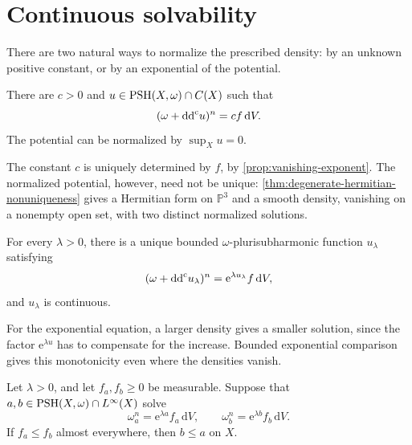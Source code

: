 \section{Continuous solvability}

There are two natural ways to normalize the prescribed density: by an unknown positive constant, or by an exponential of the potential.

\begin{theorem}\label{thm:kn-continuous}
There are $c>0$ and $u\in\mathrm{PSH}(X,\omega)\cap C(X)$ such that
\[
 (\omega+\mathrm{dd}^{\mathrm{c}} u)^n=c f\,\mathrm{d}V.
\]
The potential can be normalized by $\sup_Xu=0$.
\end{theorem}

The constant $c$ is uniquely determined by $f$, by \cref{prop:vanishing-exponent}. The normalized potential, however, need not be unique: \cref{thm:degenerate-hermitian-nonuniqueness} gives a Hermitian form on $\mathbb P^3$ and a smooth density, vanishing on a nonempty open set, with two distinct normalized solutions.

\begin{theorem}[Nguyen]\label{thm:nguyen-exp}
For every $\lambda>0$, there is a unique bounded $\omega$-plurisubharmonic function $u_\lambda$ satisfying
\begin{equation}\label{eq:weak-exp}
 (\omega+\mathrm{dd}^{\mathrm{c}} u_\lambda)^n=\mathrm{e}^{\lambda u_\lambda}f\,\mathrm{d}V,
\end{equation}
and $u_\lambda$ is continuous.
\end{theorem}





For the exponential equation, a larger density gives a smaller solution, since the factor $\mathrm{e}^{\lambda u}$ has to compensate for the increase. Bounded exponential comparison gives this monotonicity even where the densities vanish.

\begin{lemma}\label{lem:exp-order}
Let $\lambda>0$, and let $f_a,f_b\geq0$ be measurable. Suppose that $a,b\in\mathrm{PSH}(X,\omega)\cap L^\infty(X)$ solve
\[
 \omega_a^n=\mathrm{e}^{\lambda a}f_a\,\mathrm{d}V,\qquad
 \omega_b^n=\mathrm{e}^{\lambda b}f_b\,\mathrm{d}V.
\]
If $f_a\leq f_b$ almost everywhere, then $b\leq a$ on $X$.
\end{lemma}

